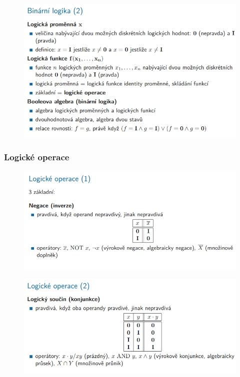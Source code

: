 \documentclass[10pt,a4paper]{article}
\begin{document}
\begin{figure} [h]
	\includegraphics[scale=0.65]{img/prvni_odstavec/otazka2/binarni_logika2.png}	
\end{figure}

\clearpage
\subsubsection{Logické operace}
\begin{figure} [h]
	\includegraphics[scale=0.65]{img/prvni_odstavec/otazka2/logicke_operace1.png}	
\end{figure}

\begin{figure} [h]
	\includegraphics[scale=0.65]{img/prvni_odstavec/otazka2/logicke_operace2.png}	
\end{figure}
\end{document}
